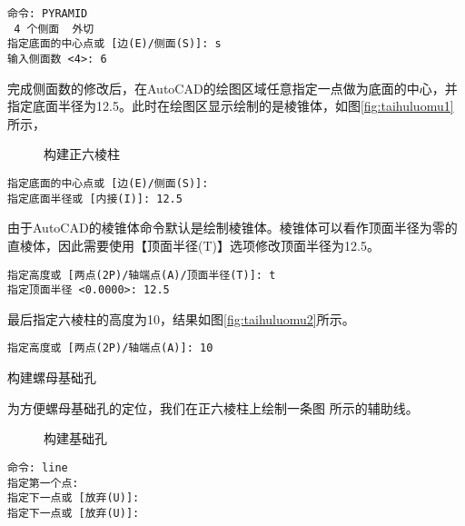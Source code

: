 \begin{procedure}
\begin{lstlisting}
命令: PYRAMID
 4 个侧面  外切
指定底面的中心点或 [边(E)/侧面(S)]: s
输入侧面数 <4>: 6
\end{lstlisting}

完成侧面数的修改后，在AutoCAD的绘图区域任意指定一点做为底面的中心，并指定底面半径为12.5。此时在绘图区显示绘制的是棱锥体，如图\ref{fig:taihuluomu1} 所示，

\begin{figure}[htbp]
\centering
{}\hspace{20pt}
\caption{构建正六棱柱}
\end{figure}

\begin{lstlisting}
指定底面的中心点或 [边(E)/侧面(S)]:
指定底面半径或 [内接(I)]: 12.5
\end{lstlisting}

由于AutoCAD的棱锥体命令默认是绘制棱锥体。棱锥体可以看作顶面半径为零的直棱体，因此需要使用【顶面半径(T)】选项修改顶面半径为12.5。

\begin{lstlisting}
指定高度或 [两点(2P)/轴端点(A)/顶面半径(T)]: t
指定顶面半径 <0.0000>: 12.5
\end{lstlisting}

最后指定六棱柱的高度为10，结果如图\ref{fig:taihuluomu2}所示。

\begin{lstlisting}
指定高度或 [两点(2P)/轴端点(A)]: 10
\end{lstlisting}

\item 构建螺母基础孔

为方便螺母基础孔的定位，我们在正六棱柱上绘制一条图 所示的辅助线。

\begin{figure}[htbp]
\centering
{}\hspace{20pt}
\caption{构建基础孔}
\end{figure}

\begin{lstlisting}
命令: line
指定第一个点:
指定下一点或 [放弃(U)]:
指定下一点或 [放弃(U)]:
\end{lstlisting}



\end{procedure}
